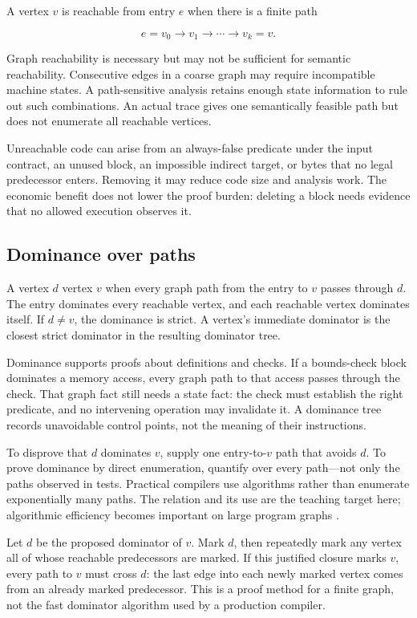 A vertex \(v\) is reachable from entry \(e\) when there is a finite path

\[
  e=v_0\to v_1\to\cdots\to v_k=v.
\]

Graph reachability is necessary but may not be sufficient for semantic
reachability. Consecutive edges in a coarse graph may require incompatible
machine states. A path-sensitive analysis retains enough state information to
rule out such combinations. An actual trace gives one semantically feasible
path but does not enumerate all reachable vertices.

Unreachable code can arise from an always-false predicate under the input
contract, an unused block, an impossible indirect target, or bytes that no
legal predecessor enters. Removing it may reduce code size and analysis work.
The economic benefit does not lower the proof burden: deleting a block needs
evidence that no allowed execution observes it.

\subsection{Dominance over paths}

A vertex \(d\)  vertex \(v\) when every graph path from the
entry to \(v\) passes through \(d\). The entry dominates every reachable
vertex, and each reachable vertex dominates itself. If \(d\ne v\), the
dominance is strict. A vertex's immediate dominator is the closest strict
dominator in the resulting dominator tree.

Dominance supports proofs about definitions and checks. If a bounds-check
block dominates a memory access, every graph path to that access passes through
the check. That graph fact still needs a state fact: the check must establish
the right predicate, and no intervening operation may invalidate it. A
dominance tree records unavoidable control points, not the meaning of their
instructions.

To disprove that \(d\) dominates \(v\), supply one entry-to-\(v\) path that
avoids \(d\). To prove dominance by direct enumeration, quantify over every
path—not only the paths observed in tests. Practical compilers use algorithms
rather than enumerate exponentially many paths. The relation and its use are
the teaching target here; algorithmic efficiency becomes important on large
program graphs \autocite{allen1970control,lengauertarjan1979dominators}.

\begin{proofkit}[title={A simple dominance proof by predecessor closure}]
Let \(d\) be the proposed dominator of \(v\). Mark \(d\), then repeatedly mark
any vertex all of whose reachable predecessors are marked. If this justified
closure marks \(v\), every path to \(v\) must cross \(d\): the last edge into
each newly marked vertex comes from an already marked predecessor. This is a
proof method for a finite graph, not the fast dominator algorithm used by a
production compiler.
\end{proofkit}

